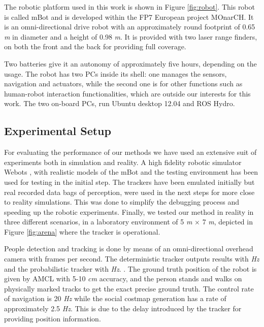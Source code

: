 The robotic platform used in this work is shown in Figure \ref{fig:robot}. This robot is called mBot \cite{Messias2014robotic} and is developed within the FP7 European project MOnarCH.
It is an omni-directional drive robot with an approximately round footprint of 0.65 \textit{m} in diameter and a height of 0.98 \textit{m}.
It is provided with two laser range finders, on both the front and the back for providing full coverage.

Two batteries give it an autonomy of approximately five hours, depending on the usage.
The robot has two PCs inside its shell: one manages the sensors, navigation and actuators, while the second one is for other functions such as human-robot interaction functionalities, which are outside our interests for this work. The two on-board PCs, run Ubuntu desktop 12.04 and ROS Hydro. 


\subsection{Experimental Setup}
\label{sec:Experimental_setup}


For evaluating the performance of our methods we have used an extensive suit of experiments both in simulation and reality. A high fidelity robotic simulator Webots \cite{michel1998webots}, with realistic models of the mBot and the testing environment has been used for testing in the initial step. The trackers have been emulated initially but real recorded data bags of perception, were used in the next steps for more close to reality simulations. This was done to simplify the debugging process and speeding up the robotic experiments. %
Finally, we tested our method in reality in three different scenarios, in a laboratory environment of 5 \textit{m} $\times$ 7 \textit{m}, depicted in Figure \ref{fig:arena} where the tracker is operational.
 


People detection and tracking is done by means of an omni-directional overhead camera  with  frames per second. The deterministic tracker outputs results with   \textit{Hz} and the probabilistic tracker with   \textit{Hz}.  . The ground truth position of the robot is given by AMCL with 5-10 \textit{cm} accuracy, and the person stands and walks on physically marked tracks to get the exact precise ground truth.
The control rate of navigation is 20 \textit{Hz} while the social costmap generation has a rate of approximately 2.5 \textit{Hz}. This is due to the delay introduced by the tracker for providing position information.


